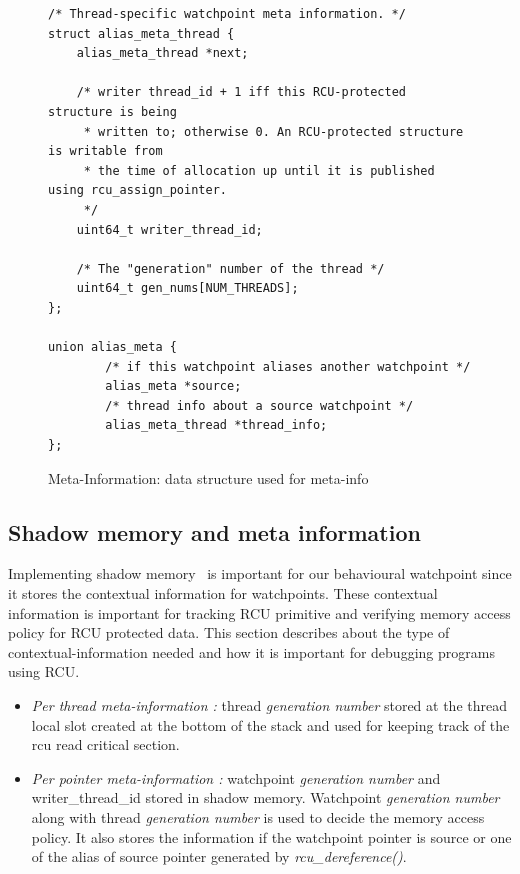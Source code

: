 \begin{figure}
\centering
\begin{lstlisting}
/* Thread-specific watchpoint meta information. */
struct alias_meta_thread {
    alias_meta_thread *next;

    /* writer thread_id + 1 iff this RCU-protected structure is being
     * written to; otherwise 0. An RCU-protected structure is writable from
     * the time of allocation up until it is published using rcu_assign_pointer.
     */
    uint64_t writer_thread_id;

    /* The "generation" number of the thread */
    uint64_t gen_nums[NUM_THREADS];
};

union alias_meta {
        /* if this watchpoint aliases another watchpoint */
        alias_meta *source;
        /* thread info about a source watchpoint */
        alias_meta_thread *thread_info;
}; 
\end{lstlisting}
\caption{Meta-Information: data structure used for meta-info}\label{fig:metainfo}
\end{figure}

\subsection{Shadow memory and meta information}
Implementing shadow memory~\cite{Memcheck} is important for our behavioural watchpoint since it stores the contextual information for watchpoints. These contextual information is important for tracking RCU primitive and verifying memory access policy for RCU protected data. This section describes about the type of contextual-information needed and how it is important for debugging programs using RCU.
\begin{itemize}
 	\item \emph{Per thread meta-information :} thread \emph{generation number} stored at the thread local slot created at the bottom of the stack and used for keeping track of the rcu read critical section.%
   	\item \emph{Per pointer meta-information :} watchpoint \emph{generation number} and writer\_thread\_id stored in shadow memory.  Watchpoint \emph{generation number} along with thread \emph{generation number} is used to decide the memory access policy. It also stores the information if the watchpoint pointer is source or one of the alias of source pointer generated by \emph{rcu\_dereference()}. %
\end{itemize} 

